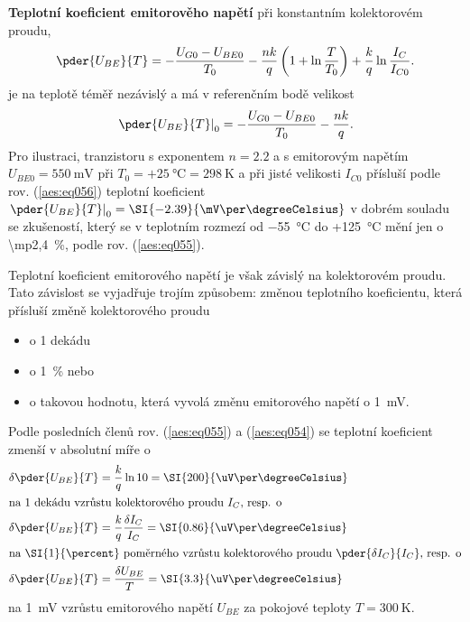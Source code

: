         \textbf{Teplotní koeficient emitorověho napětí} při konstantním kolektorovém proudu,
        \begin{equation}\label{aes:eq055}
          \pder{U_{BE}}{T} = - \dfrac{U_{G0} - U_{BE0}}{T_0} - 
                   \dfrac{nk}{q}\left(1 + \ln\dfrac{T}{T_0}\right) +
                   \dfrac{k}{q}\ln\dfrac{I_C}{I_{C0}}.
        \end{equation}
        je na teplotě téměř nezávislý a má v referenčním bodě velikost
        \begin{equation}\label{aes:eq056}
          \left.\pder{U_{BE}}{T}\right\rvert_0 = - \dfrac{U_{G0} - U_{BE0}}{T_0} - \dfrac{nk}{q}.
        \end{equation}
        Pro ilustraci, tranzistoru s exponentem \(n = \num{2.2}\) a s emitorovým napětím \(U_{BE0} =
        \SI{550}{\mV}\) při \(T_0 = +\SI{25}{\degreeCelsius} = \SI{298}{\K}\) a při jisté velikosti
        \(I_{C0}\) přísluší podle rov. (\ref{aes:eq056}) teplotní koeficient
        \(\left.\pder{U_{BE}}{T}\right\rvert_0 = \SI{-2.39}{\mV\per\degreeCelsius}\) v dobrém
        souladu se zkušeností, který se v teplotním rozmezí od \SI{-55}{\degreeCelsius} do
        +\SI{125}{\degreeCelsius} mění jen o \SI{\mp2,4}{\percent}, podle rov. (\ref{aes:eq055}).

        Teplotní koeficient emitorového napětí je však závislý na kolektorovém proudu. Tato
        závislost se vyjadřuje trojím způsobem: změnou teplotního koeficientu, která přísluší změně
        kolektorového proudu
        \begin{itemize}[noitemsep]
          \item o 1 dekádu
          \item o \SI{1}{\percent} nebo
          \item o takovou hodnotu, která vyvolá změnu emitorového napětí o \SI{1}{\mV}.                 
        \end{itemize}

        Podle posledních členů rov. (\ref{aes:eq055}) a (\ref{aes:eq054}) se teplotní koeficient
        zmenší v absolutní míře o
        \begin{subequations}\label{aes:eq057}
          \begin{align}
            \delta\pder{U_{BE}}{T} &= \dfrac{k}{q}\ln10 
                                    = \SI{200}{\uV\per\degreeCelsius}    \label{aes:eq057a}   \\
            \shortintertext{na 1 dekádu vzrůstu kolektorového proudu \(I_C\), resp. o}
            \delta\pder{U_{BE}}{T} &= \dfrac{k}{q}\dfrac{\delta I_C}{I_C}
                                    = \SI{0.86}{\uV\per\degreeCelsius}   \label{aes:eq057b}   \\
            \shortintertext{na \SI{1}{\percent} poměrného vzrůstu kolektorového proudu 
                            \(\pder{\delta I_C}{I_C}\), resp. o}
            \delta\pder{U_{BE}}{T} &= \dfrac{\delta U_{BE}}{T}
                                    = \SI{3.3}{\uV\per\degreeCelsius}    \label{aes:eq057c}
          \end{align}
        \end{subequations}
        na \SI{1}{\mV} vzrůstu emitorového napětí \(U_{BE}\) za pokojové teploty \(T=\SI{300}{\K}\).

